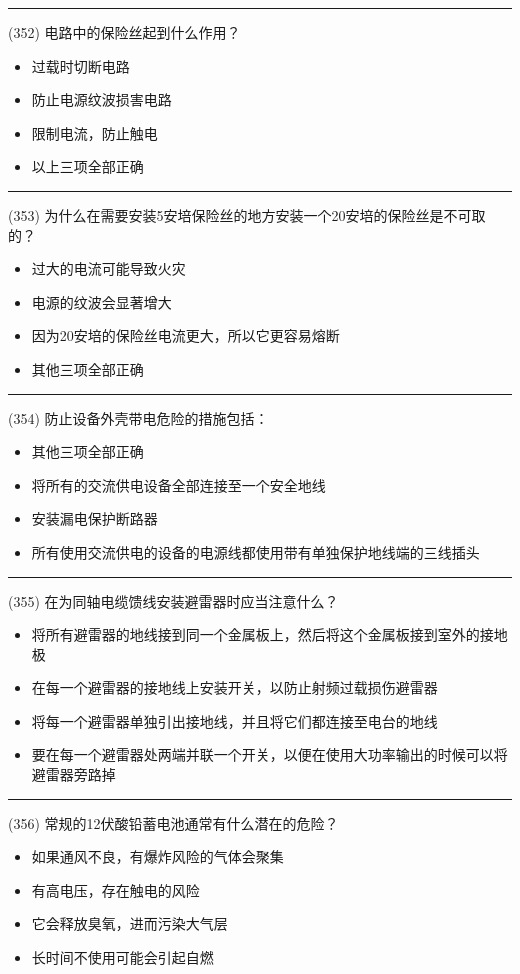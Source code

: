 \documentclass[twocolumn]{ctexart}  %
\begin{document}
\noindent\rule{0.5\textwidth}{1pt}
\heiti (352) 电路中的保险丝起到什么作用？ \songti {\color{gray} [LK1225] }
\begin{itemize}
	\item  过载时切断电路
	\item  防止电源纹波损害电路
	\item  限制电流，防止触电
	\item  以上三项全部正确
\end{itemize}


\noindent\rule{0.5\textwidth}{1pt}
\heiti (353) 为什么在需要安装5安培保险丝的地方安装一个20安培的保险丝是不可取的？ \songti {\color{gray} [LK1226] }
\begin{itemize}
	\item  过大的电流可能导致火灾
	\item  电源的纹波会显著增大
	\item  因为20安培的保险丝电流更大，所以它更容易熔断
	\item  其他三项全部正确
\end{itemize}


\noindent\rule{0.5\textwidth}{1pt}
\heiti (354) 防止设备外壳带电危险的措施包括： \songti {\color{gray} [LK1227] }
\begin{itemize}
	\item  其他三项全部正确
	\item  将所有的交流供电设备全部连接至一个安全地线
	\item  安装漏电保护断路器
	\item  所有使用交流供电的设备的电源线都使用带有单独保护地线端的三线插头
\end{itemize}


\noindent\rule{0.5\textwidth}{1pt}
\heiti (355) 在为同轴电缆馈线安装避雷器时应当注意什么？ \songti {\color{gray} [LK1228] }
\begin{itemize}
	\item  将所有避雷器的地线接到同一个金属板上，然后将这个金属板接到室外的接地极
	\item  在每一个避雷器的接地线上安装开关，以防止射频过载损伤避雷器
	\item  将每一个避雷器单独引出接地线，并且将它们都连接至电台的地线
	\item  要在每一个避雷器处两端并联一个开关，以便在使用大功率输出的时候可以将避雷器旁路掉
\end{itemize}


\noindent\rule{0.5\textwidth}{1pt}
\heiti (356) 常规的12伏酸铅蓄电池通常有什么潜在的危险？ \songti {\color{gray} [LK1230] }
\begin{itemize}
	\item  如果通风不良，有爆炸风险的气体会聚集
	\item  有高电压，存在触电的风险
	\item  它会释放臭氧，进而污染大气层
	\item  长时间不使用可能会引起自燃
\end{itemize}
\end{document}
